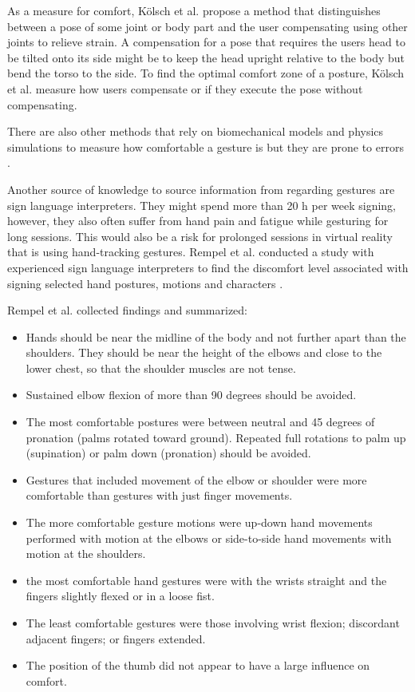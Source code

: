 As a measure for comfort, Kölsch et al. propose a method that distinguishes between a pose of some joint or body part and the user compensating using other joints to relieve strain. A compensation for a pose that requires the users head to be tilted onto its side might be to keep the head upright relative to the body but bend the torso to the side. To find the optimal comfort zone of a posture, Kölsch et al. \cite{Koelsch} measure how users compensate or if they execute the pose without compensating. 

There are also other methods that rely on biomechanical models and physics simulations to measure how comfortable a gesture is but they are prone to errors \cite{Stern2006}.

Another source of knowledge to source information from regarding gestures are sign language interpreters. They might spend more than 20 h per week signing, however, they also often suffer from hand pain and fatigue while gesturing for long sessions. This would also be a risk for prolonged sessions in virtual reality that is using hand-tracking gestures. Rempel et al. conducted a study with experienced sign language interpreters to find the discomfort level associated with signing selected hand postures, motions and characters \cite{Rempel2014}. 

Rempel et al. \cite{Rempel2014} collected findings and summarized:
\begin{itemize}
  \item Hands should be near the midline of the body and not further apart than the shoulders. They should be near the height of the elbows and close to the lower chest, so that the shoulder muscles are not tense. 
  \item Sustained elbow flexion of more than 90 degrees should be avoided.
  \item The most comfortable postures were between neutral and 45 degrees of pronation (palms rotated toward ground). Repeated full rotations to palm up (supination) or palm down (pronation) should be avoided.
  \item Gestures that included movement of the elbow or shoulder were more comfortable than gestures with just finger movements.
  \item The more comfortable gesture motions were up-down hand movements performed with motion at the elbows or side-to-side hand movements with motion at the shoulders. 
  \item the most comfortable hand gestures were with the wrists straight and the fingers slightly flexed or in a loose fist.
  \item The least comfortable gestures were those involving wrist flexion; discordant adjacent fingers; or fingers extended.
  \item The position of the thumb did not appear to have a large influence on comfort.
\end{itemize}



